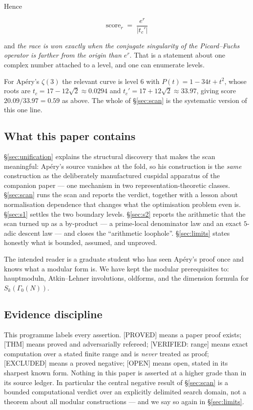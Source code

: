 \documentclass[11pt,reqno]{amsart}
\theoremstyle{plain}
\theoremstyle{definition}
\theoremstyle{remark}
\newcommand{\tc}{t_c}
\newcommand{\tcp}{t_c'}
\newcommand{\Ga}{\Gamma_0}
\newcommand{\Thm}{\textup{\textsf{[THM]}}}
\newcommand{\Proved}{\textup{\textsf{[PROVED]}}}
\newcommand{\VerifiedR}[1]{\textup{\textsf{[VERIFIED: #1]}}}
\newcommand{\Excluded}{\textup{\textsf{[EXCLUDED]}}}
\newcommand{\Open}{\textup{\textsf{[OPEN]}}}
\begin{document}
Hence

\begin{equation}
\label{eq:score}
  \boxed{\;\mathrm{score}_r \;=\; \frac{e^r}{|\tcp|}\;}
\end{equation}

and \emph{the race is won exactly when the conjugate singularity of the
Picard--Fuchs operator is farther from the origin than $e^r$}. That is a
statement about one complex number attached to a level, and one can
enumerate levels.

For Ap\'ery's $\zeta(3)$ the relevant curve is level $6$ with
$P(t)=1-34t+t^2$, whose roots are $\tc=17-12\sqrt2\approx 0.0294$ and
$\tcp = 17+12\sqrt2\approx 33.97$, giving score $20.09/33.97=0.59$ as
above. The whole of \S\ref{sec:scan} is the systematic version of this
one line.

\subsection{What this paper contains}

\S\ref{sec:unification} explains the structural discovery that makes the
scan meaningful: Ap\'ery's source vanishes at the fold, so his
construction is the \emph{same} construction as the deliberately
manufactured cuspidal apparatus of the companion paper --- one mechanism
in two representation-theoretic classes. \S\ref{sec:scan} runs the scan
and reports the verdict, together with a lesson about normalisation
dependence that changes what the optimisation problem even is.
\S\ref{sec:s1} settles the two boundary levels. \S\ref{sec:s2} reports
the arithmetic that the scan turned up as a by-product --- a prime-local
denominator law and an exact $5$-adic descent law --- and closes the
``arithmetic loophole''. \S\ref{sec:limits} states honestly what is
bounded, assumed, and unproved.

The intended reader is a graduate student who has seen Ap\'ery's proof
once and knows what a modular form is. We have kept the modular
prerequisites to: hauptmoduln, Atkin--Lehner involutions, oldforms, and
the dimension formula for $S_k(\Ga(N))$.

\subsection{Evidence discipline}

This programme labels every assertion. \Proved{} means a paper proof
exists; \Thm{} means proved and adversarially refereed; \VerifiedR{range}
means exact computation over a stated finite range and is \emph{never}
treated as proof; \Excluded{} means a proved negative; \Open{} means open,
stated in its sharpest known form. Nothing in this paper is asserted at a
higher grade than in its source ledger. In particular the central
negative result of \S\ref{sec:scan} is a bounded computational verdict
over an explicitly delimited search domain, not a theorem about all
modular constructions --- and we say so again in \S\ref{sec:limits}.
\end{document}
